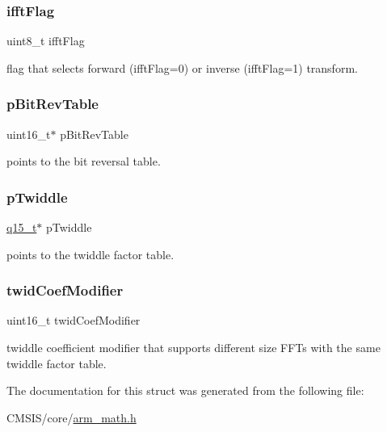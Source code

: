 \subsubsection{\texorpdfstring{ifftFlag}{ifftFlag}}
{\footnotesize\ttfamily uint8\+\_\+t ifft\+Flag}

flag that selects forward (ifft\+Flag=0) or inverse (ifft\+Flag=1) transform. \mbox{\label{structarm__cfft__radix4__instance__q15_a46a2fb328199897af100fea0bfdf59aa}} 
\subsubsection{\texorpdfstring{pBitRevTable}{pBitRevTable}}
{\footnotesize\ttfamily uint16\+\_\+t$\ast$ p\+Bit\+Rev\+Table}

points to the bit reversal table. \mbox{\label{structarm__cfft__radix4__instance__q15_aa8c837c05b2c910342ab8f171d30dc02}} 
\subsubsection{\texorpdfstring{pTwiddle}{pTwiddle}}
{\footnotesize\ttfamily \mbox{\hyperlink{arm__math_8h_ab5a8fb21a5b3b983d5f54f31614052ea}{q15\+\_\+t}}$\ast$ p\+Twiddle}

points to the twiddle factor table. \mbox{\label{structarm__cfft__radix4__instance__q15_afe772e5b5001c9d8e85032115a8df5bf}} 
\subsubsection{\texorpdfstring{twidCoefModifier}{twidCoefModifier}}
{\footnotesize\ttfamily uint16\+\_\+t twid\+Coef\+Modifier}

twiddle coefficient modifier that supports different size F\+F\+Ts with the same twiddle factor table. 

The documentation for this struct was generated from the following file\+:\begin{DoxyCompactItemize}
\item 
C\+M\+S\+I\+S/core/\mbox{\hyperlink{arm__math_8h}{arm\+\_\+math.\+h}}\end{DoxyCompactItemize}
